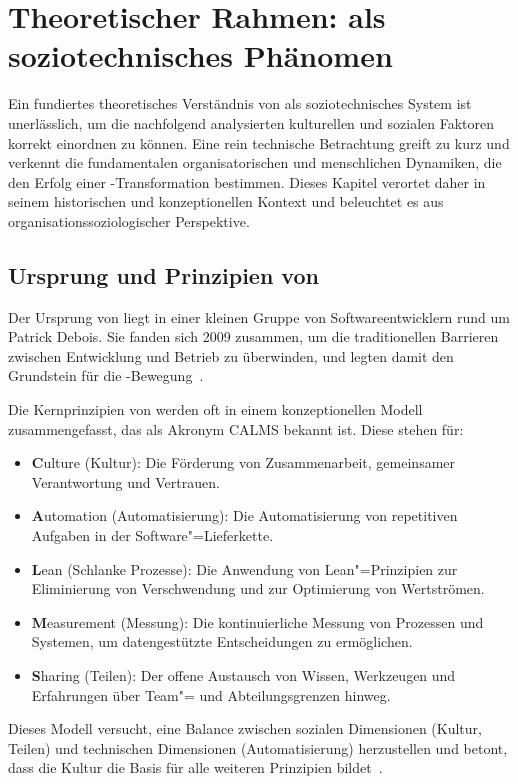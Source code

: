\chapter{Theoretischer Rahmen: \DO als soziotechnisches Phänomen}
\label{ch:theoretical-framework}

Ein fundiertes theoretisches Verständnis von \DO als soziotechnisches System ist unerlässlich, um die nachfolgend analysierten kulturellen und sozialen Faktoren korrekt einordnen zu können.
Eine rein technische Betrachtung greift zu kurz und verkennt die fundamentalen organisatorischen und menschlichen Dynamiken, die den Erfolg einer \DO-Transformation bestimmen.
Dieses Kapitel verortet \DO daher in seinem historischen und konzeptionellen Kontext und beleuchtet es aus organisationssoziologischer Perspektive.

\section{Ursprung und Prinzipien von \DO}

Der Ursprung von \DO liegt in einer kleinen Gruppe von Softwareentwicklern rund um Patrick Debois.
Sie fanden sich 2009 zusammen, um die traditionellen Barrieren zwischen Entwicklung und Betrieb zu überwinden, und legten damit den Grundstein für die \DO-Bewegung~\cite[10]{jha23}.

Die Kernprinzipien von \DO werden oft in einem konzeptionellen Modell zusammengefasst, das als Akronym CALMS bekannt ist. Diese stehen für:

\begin{itemize}
	\item \textbf{C}ulture (Kultur): Die Förderung von Zusammenarbeit, gemeinsamer Verantwortung und Vertrauen.
	\item \textbf{A}utomation (Automatisierung): Die Automatisierung von repetitiven Aufgaben in der Software"=Lieferkette.
	\item \textbf{L}ean (Schlanke Prozesse): Die Anwendung von Lean"=Prinzipien zur Eliminierung von Verschwendung und zur Optimierung von Wertströmen.
	\item \textbf{M}easurement (Messung): Die kontinuierliche Messung von Prozessen und Systemen, um datengestützte Entscheidungen zu ermöglichen.
	\item \textbf{S}haring (Teilen): Der offene Austausch von Wissen, Werkzeugen und Erfahrungen über Team"= und Abteilungsgrenzen hinweg.
\end{itemize}
Dieses Modell versucht, eine Balance zwischen sozialen Dimensionen (Kultur, Teilen) und technischen Dimensionen (Automatisierung) herzustellen und betont, dass die Kultur die Basis für alle weiteren Prinzipien bildet~\cite[14\psq]{jha23}.

